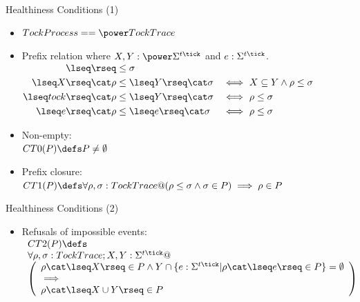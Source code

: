 \documentclass[fleqn]{beamer}
\newenvironment{slide-nocite}[1]
{\begin{frame}[fragile,environment=slide-nocite]
\frametitle{#1}\begin{refsegment}}
{\end{refsegment}\end{frame}}%
\begin{document}
\begin{slide-nocite}{Healthiness Conditions (1)}
  \begin{itemize}
    \item $TockProcess == \power TockTrace$\\
    \item Prefix relation where $X, Y : \power \Sigma^{t\tick}$ and $e : \Sigma^{t\tick}$.\\
      $\begin{aligned}
          \lseq\rseq                   &\le  \sigma
        \\\lseq X \rseq \cat \rho      &\le  \lseq Y \rseq \cat \sigma &\iff&~ X \subseteq Y \land \rho \le \sigma
        \\\lseq tock \rseq \cat \rho   &\le  \lseq Y \rseq \cat \sigma &\iff&~ \rho \le \sigma
        \\\lseq e \rseq \cat \rho      &\le  \lseq e \rseq \cat \sigma &\iff&~ \rho \le \sigma
      \end{aligned}$
  \end{itemize}
  \begin{itemize}
    \item Non-empty:\\
    $CT0(P) \circdef P \neq \emptyset$
    \item Prefix closure:\\
    $CT1(P) \circdef \forall \rho, \sigma : TockTrace @ (\rho \le \sigma \land \sigma \in P) \implies \rho \in P$
  \end{itemize}
\end{slide-nocite}

\begin{slide-nocite}{Healthiness Conditions (2)}
  \begin{itemize}
    \item Refusals of impossible events:\\
    $\begin{array}{l}
      CT2(P) \circdef \\
        \forall \rho, \sigma : TockTrace; X, Y: \Sigma^{t\tick} @ \\
        \left(\begin{array}{l}
          \rho \cat \lseq X \rseq \in P \land Y \cap \{e : \Sigma^{t\tick} | \rho \cat \lseq e \rseq \in P\} = \emptyset
          \\ \implies \\
          \rho \cat \lseq X \cup Y \rseq \in P
        \end{array}\right)
      \end{array}$
  \end{itemize}
\end{slide-nocite}
\end{document}
